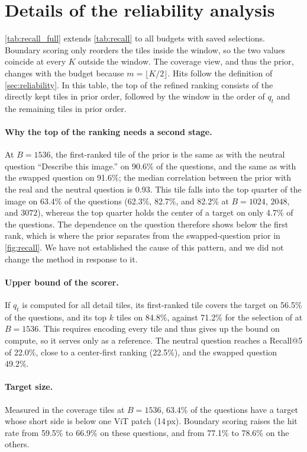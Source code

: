 \section{Details of the reliability analysis}
\label{sec:reliability_supp}



\cref{tab:recall_full} extends \cref{tab:recall} to all budgets with saved selections. Boundary scoring only
reorders the tiles inside the window, so the two values coincide at every $K$ outside the window. The coverage
view, and thus the prior, changes with the budget because $m=\lfloor K/2\rfloor$. Hits follow the definition of
\cref{sec:reliability}. In this table, the top of the refined ranking consists of the directly kept tiles in
prior order, followed by the window in the order of $q_t$ and the remaining tiles in prior order.

\paragraph{Why the top of the ranking needs a second stage.}
At $B=1536$, the first-ranked tile of the prior is the same as with the neutral question ``Describe this
image.'' on 90.6\% of the questions, and the same as with the swapped question on 91.6\%; the median
correlation between the prior with the real and the neutral question is 0.93. This tile falls into the top
quarter of the image on 63.4\% of the questions (62.3\%, 82.7\%, and 82.2\% at $B=1024$, $2048$, and $3072$), whereas
the top quarter holds the center of a target on only 4.7\% of the questions. The dependence on the question
therefore shows below the first rank, which is where the prior separates from the swapped-question prior
in \cref{fig:recall}. We have not established the cause of this pattern, and we did not change the method in
response to it.

\paragraph{Upper bound of the scorer.}
If $q_t$ is computed for all detail tiles, its first-ranked tile covers the target on 56.5\% of the questions,
and its top $k$ tiles on 84.8\%, against 71.2\% for the selection of \method at $B=1536$. This requires encoding
every tile and thus gives up the bound on compute, so it serves only as a reference. The neutral question
reaches a Recall@5 of 22.0\%, close to a center-first ranking (22.5\%), and the swapped question 49.2\%.

\paragraph{Target size.}
Measured in the coverage tiles at $B=1536$, 63.4\% of the questions have a target whose short side is below one
ViT patch (14\,px). Boundary scoring raises the hit rate from 59.5\% to 66.9\% on these questions, and from 77.1\%
to 78.6\% on the others.
